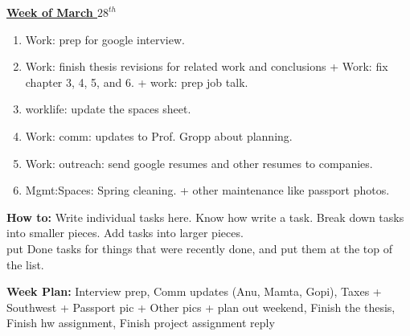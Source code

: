 \documentclass[11pt]{article}
\newcommand{\comments}[1]{}
\begin{document}
{\small \underline{\textbf{Week of March $28^{th}$}}}\\  
\begin{enumerate} 
\small \item \small Work: prep for google interview. 
\small \item \small Work: finish thesis revisions for related work and
conclusions + Work: fix chapter 3, 4, 5, and 6. + work: prep job
talk. 
\item \small worklife: update the spaces sheet. 
\small \item \small Work: comm: updates to Prof. Gropp about planning.  
\small \item \small Work: outreach:  send google resumes and other resumes to
companies. 
\item \small Mgmt:Spaces: Spring cleaning. + other maintenance like
  passport photos.  
\end{enumerate} 

\newpage 
\textbf{How to:} Write individual tasks here. Know how write a task. 
Break down tasks into smaller pieces. Add tasks into larger
pieces. \\ put Done tasks for things that were recently done, and put
them at the top of the list.


\comments{
\textbf{Week Plan}: situations, thesis, self-eval, google interview,
social(rishi/sadhna), Updates to spaces sheet + clean-up +  xcel sw
flight. 

Matrimony updates + message to Sateja, organization + planning for
rest of semester, resume, email to Bronis, Thesis changes + emails
abt. research. 
} 

\textbf{Week Plan:} Interview prep, Comm updates (Anu, Mamta, Gopi),
Taxes + Southwest + Passport pic + Other pics + plan out weekend, Finish the thesis,  Finish
hw assignment, Finish project assignment reply

\end{document}
